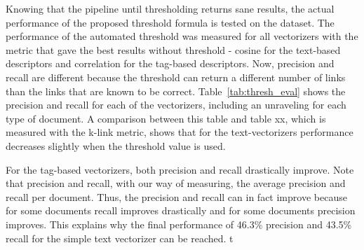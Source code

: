 Knowing that the pipeline until thresholding returns sane results, the actual performance
of the proposed threshold formula is tested on the dataset. The performance of the 
automated threshold was measured for all vectorizers with the metric that gave the best 
results without threshold - cosine for the text-based descriptors and correlation for the
tag-based descriptors. Now, precision and recall are different because the threshold can 
return a different number of links than the links that are known to be correct. Table~\ref{tab:thresh_eval} 
shows the precision and recall for each of the vectorizers, including an unraveling for
each type of document. A comparison between this table and table xx, which is
measured with the k-link metric, shows that for the text-vectorizers
performance decreases slightly when the threshold value is used. 

For the tag-based vectorizers, both precision and recall drastically
improve. Note that precision and recall, with our way of measuring, the average
precision and recall per document. Thus, the precision and recall can in fact
improve because for some documents recall improves drastically and for some
documents precision improves. This explains why the final performance of 46.3\%
precision and 43.5\% recall for the simple text vectorizer can be reached. 
t
